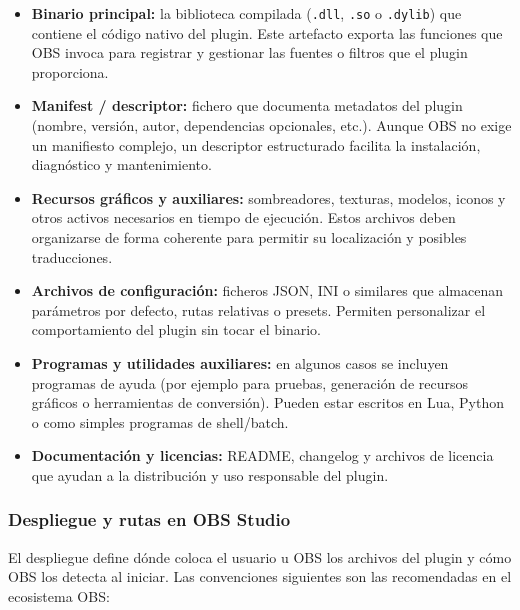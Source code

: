 \begin{itemize}
  \item \textbf{Binario principal:} la biblioteca compilada (\texttt{.dll}, \texttt{.so} o \texttt{.dylib}) que contiene el código nativo del plugin. Este artefacto exporta las funciones que OBS invoca para registrar y gestionar las fuentes o filtros que el plugin proporciona.
  \item \textbf{Manifest / descriptor:} fichero que documenta metadatos del plugin (nombre, versión, autor, dependencias opcionales, etc.). Aunque OBS no exige un manifiesto complejo, un descriptor estructurado facilita la instalación, diagnóstico y mantenimiento.
  \item \textbf{Recursos gráficos y auxiliares:} sombreadores, texturas, modelos, iconos y otros activos necesarios en tiempo de ejecución. Estos archivos deben organizarse de forma coherente para permitir su localización y posibles traducciones.
  \item \textbf{Archivos de configuración:} ficheros JSON, INI o similares que almacenan parámetros por defecto, rutas relativas o presets. Permiten personalizar el comportamiento del plugin sin tocar el binario.
  \item \textbf{Programas y utilidades auxiliares:} en algunos casos se incluyen programas de ayuda (por ejemplo para pruebas, generación de recursos gráficos o herramientas de conversión). Pueden estar escritos en Lua, Python o como simples programas de shell/batch.
  \item \textbf{Documentación y licencias:} README, changelog y archivos de licencia que ayudan a la distribución y uso responsable del plugin.
\end{itemize}



\subsubsection*{Despliegue y rutas en OBS Studio}

El despliegue define dónde coloca el usuario u OBS los archivos del plugin y cómo OBS los detecta al iniciar. Las convenciones siguientes son las recomendadas en el ecosistema OBS:

